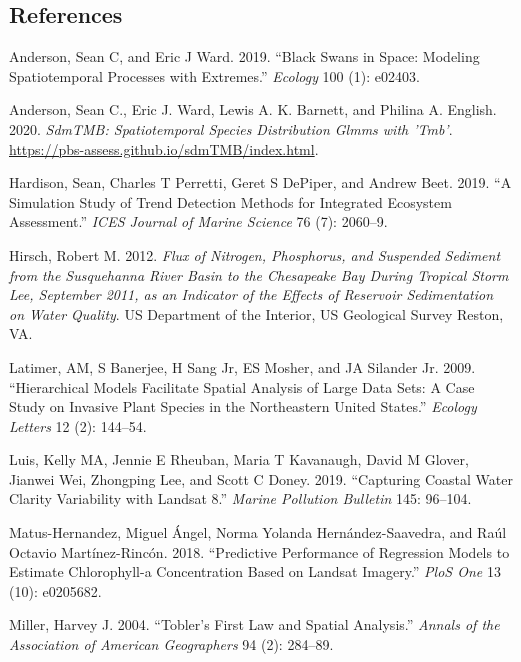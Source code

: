 \documentclass[11pt,]{article}
\begin{document}
\hypertarget{references}{%
\subsection*{References}\label{references}}

\hypertarget{refs}{}
\leavevmode\hypertarget{ref-anderson2019}{}%
Anderson, Sean C, and Eric J Ward. 2019. ``Black Swans in Space:
Modeling Spatiotemporal Processes with Extremes.'' \emph{Ecology} 100
(1): e02403.

\leavevmode\hypertarget{ref-anderson2020}{}%
Anderson, Sean C., Eric J. Ward, Lewis A. K. Barnett, and Philina A.
English. 2020. \emph{SdmTMB: Spatiotemporal Species Distribution Glmms
with 'Tmb'}. \url{https://pbs-assess.github.io/sdmTMB/index.html}.

\leavevmode\hypertarget{ref-hardison2019}{}%
Hardison, Sean, Charles T Perretti, Geret S DePiper, and Andrew Beet.
2019. ``A Simulation Study of Trend Detection Methods for Integrated
Ecosystem Assessment.'' \emph{ICES Journal of Marine Science} 76 (7):
2060--9.

\leavevmode\hypertarget{ref-hirsch2012}{}%
Hirsch, Robert M. 2012. \emph{Flux of Nitrogen, Phosphorus, and
Suspended Sediment from the Susquehanna River Basin to the Chesapeake
Bay During Tropical Storm Lee, September 2011, as an Indicator of the
Effects of Reservoir Sedimentation on Water Quality}. US Department of
the Interior, US Geological Survey Reston, VA.

\leavevmode\hypertarget{ref-latimer2009}{}%
Latimer, AM, S Banerjee, H Sang Jr, ES Mosher, and JA Silander Jr. 2009.
``Hierarchical Models Facilitate Spatial Analysis of Large Data Sets: A
Case Study on Invasive Plant Species in the Northeastern United
States.'' \emph{Ecology Letters} 12 (2): 144--54.

\leavevmode\hypertarget{ref-luis2019}{}%
Luis, Kelly MA, Jennie E Rheuban, Maria T Kavanaugh, David M Glover,
Jianwei Wei, Zhongping Lee, and Scott C Doney. 2019. ``Capturing Coastal
Water Clarity Variability with Landsat 8.'' \emph{Marine Pollution
Bulletin} 145: 96--104.

\leavevmode\hypertarget{ref-matus2018}{}%
Matus-Hernandez, Miguel Ángel, Norma Yolanda Hernández-Saavedra, and
Raúl Octavio Martínez-Rincón. 2018. ``Predictive Performance of
Regression Models to Estimate Chlorophyll-a Concentration Based on
Landsat Imagery.'' \emph{PloS One} 13 (10): e0205682.

\leavevmode\hypertarget{ref-miller2004}{}%
Miller, Harvey J. 2004. ``Tobler's First Law and Spatial Analysis.''
\emph{Annals of the Association of American Geographers} 94 (2):
284--89.
\end{document}
